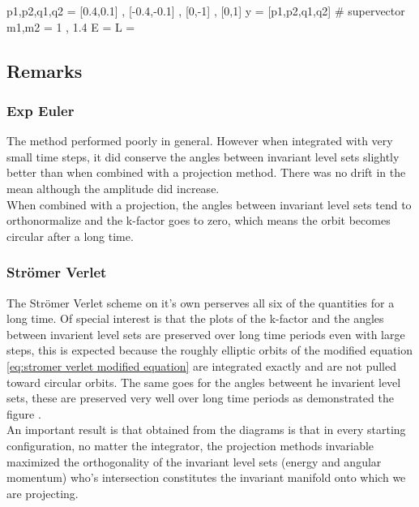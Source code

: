 \documentclass[12pt]{article}
\begin{document}
\begin{python}
p1,p2,q1,q2 = [0.4,0.1] , [-0.4,-0.1] , [0,-1] , [0,1]
y = [p1,p2,q1,q2] # supervector
m1,m2 = 1 , 1.4
E = 
L =
\end{python}



\subsection{Remarks}

\subsubsection{Exp Euler}
The method performed poorly in general. However when integrated with very small time steps, it did conserve the angles between invariant level sets slightly better than when combined with a projection method. There was no drift in the mean although the amplitude did increase. \\

When combined with a projection, the angles between invariant level sets tend to orthonormalize and the k-factor goes to zero, which means the orbit becomes circular after a long time. 

\subsubsection{Str\"omer Verlet}
The Str\"omer Verlet scheme on it's own perserves all six of the quantities for a long time. Of special interest is that the plots of the k-factor and the angles between invarient level sets are preserved over long time periods even with large steps, this is expected because the roughly elliptic orbits of the modified equation \eqref{eq:stromer verlet modified equation} are integrated exactly and are not pulled toward circular orbits. The same goes for the angles betweent he invarient level sets, these are preserved very well over long time periods as demonstrated the figure . \\

An important result is that obtained from the diagrams is that in every starting configuration, no matter the integrator, the projection methods invariable maximized the orthogonality of the invariant level sets (energy and angular momentum) who's intersection constitutes the invariant manifold onto which we are projecting.  
\end{document}
